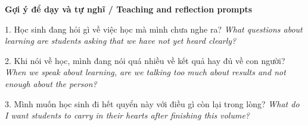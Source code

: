 \begin{tuhocnhanh}
\textbf{Gợi ý để dạy và tự nghĩ / Teaching and reflection prompts}

1. Học sinh đang hỏi gì về việc học mà mình chưa nghe ra? \textit{What questions about learning are students asking that we have not yet heard clearly?}

2. Khi nói về học, mình đang nói quá nhiều về kết quả hay đủ về con người? \textit{When we speak about learning, are we talking too much about results and not enough about the person?}

3. Mình muốn học sinh đi hết quyển này với điều gì còn lại trong lòng? \textit{What do I want students to carry in their hearts after finishing this volume?}
\end{tuhocnhanh}

\ngancach
